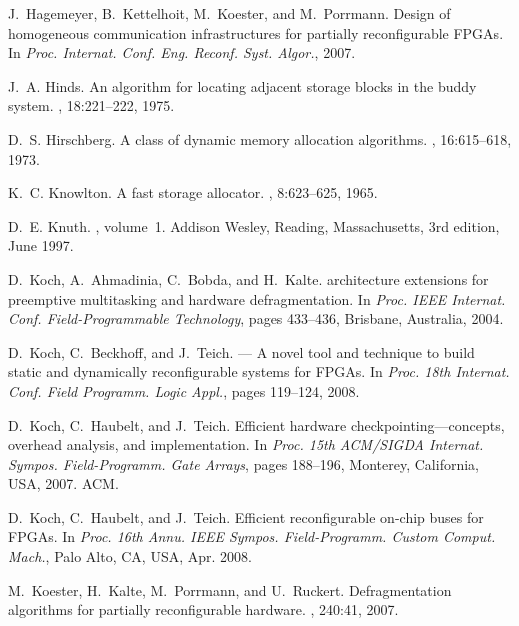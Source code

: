 \documentclass{article}
\begin{document}
\begin{thebibliography}{10}
J.~{Hagemeyer}, B.~{Kettelhoit}, M.~{Koester}, and M.~{Porrmann}.
\newblock Design of homogeneous communication infrastructures for partially
  reconfigurable {FPGAs}.
\newblock In {\em Proc. Internat. Conf. Eng. Reconf. Syst. Algor.}, 2007.

J.~A. Hinds.
\newblock An algorithm for locating adjacent storage blocks in the buddy
  system.
, 18:221--222, 1975.

D.~S. Hirschberg.
\newblock A class of dynamic memory allocation algorithms.
, 16:615--618, 1973.

K.~C. Knowlton.
\newblock A fast storage allocator.
, 8:623--625, 1965.

D.~E. Knuth.
,
  volume~1.
\newblock Addison Wesley, Reading, Massachusetts, 3rd edition, June 1997.

D.~Koch, A.~Ahmadinia, C.~Bobda, and H.~Kalte.
 architecture extensions for preemptive multitasking and
  hardware defragmentation.
\newblock In {\em Proc. IEEE Internat. Conf. Field-Programmable Technology},
  pages 433--436, Brisbane, Australia, 2004.

D.~Koch, C.~Beckhoff, and J.~Teich.
 --- {A} novel tool and technique to build static and
  dynamically reconfigurable systems for {FPGAs}.
\newblock In {\em Proc. 18th Internat. Conf. Field Programm. Logic Appl.},
  pages 119--124, 2008.

D.~Koch, C.~Haubelt, and J.~Teich.
\newblock Efficient hardware checkpointing---concepts, overhead analysis, and
  implementation.
\newblock In {\em Proc. 15th ACM/SIGDA Internat. Sympos. Field-Programm. Gate
  Arrays}, pages 188--196, Monterey, California, USA, 2007. ACM.

D.~{Koch}, C.~{Haubelt}, and J.~{Teich}.
\newblock Efficient reconfigurable on-chip buses for {FPGAs}.
\newblock In {\em Proc. 16th Annu. IEEE Sympos. Field-Programm. Custom Comput.
  Mach.}, Palo Alto, CA, USA, Apr. 2008.

M.~Koester, H.~Kalte, M.~Porrmann, and U.~Ruckert.
\newblock Defragmentation algorithms for partially reconfigurable hardware.
, 240:41, 2007.


\end{thebibliography}
\end{document}
